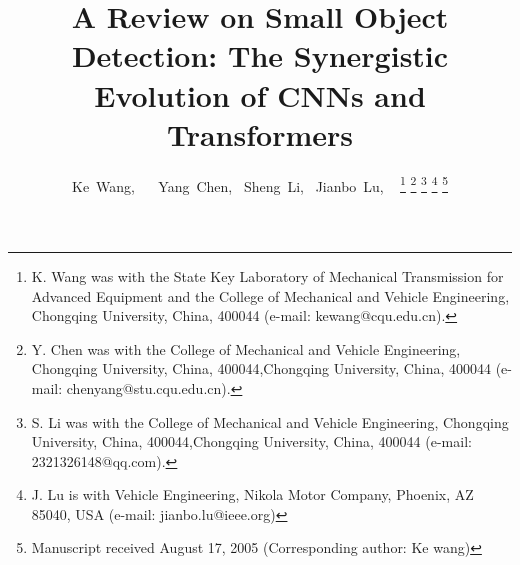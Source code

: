 \documentclass[journal]{IEEEtran}
\begin{document}
%

\title{A Review on Small Object Detection: The Synergistic Evolution of CNNs and Transformers}
%
%
%
\author{Ke~Wang, ~ 
	~Yang~Chen,%
	~Sheng~Li,
	~Jianbo~Lu,  ~
	\thanks{K. Wang was with the State Key Laboratory of Mechanical Transmission for Advanced Equipment and the College of Mechanical and Vehicle Engineering, Chongqing University, China, 400044 (e-mail: kewang@cqu.edu.cn).}%
	\thanks{Y. Chen was with the College of Mechanical and Vehicle Engineering, Chongqing University, China, 400044,Chongqing University, China, 400044 (e-mail: chenyang@stu.cqu.edu.cn).}%
	\thanks{S. Li was with the College of Mechanical and Vehicle Engineering, Chongqing University, China, 400044,Chongqing University, China, 400044 (e-mail: 2321326148@qq.com).}
	\thanks{J. Lu is with Vehicle Engineering, Nikola Motor Company, Phoenix, AZ 85040, USA (e-mail: jianbo.lu@ieee.org)}%
	\thanks{Manuscript received August 17, 2005  (Corresponding author: Ke wang)}}
\end{document}
